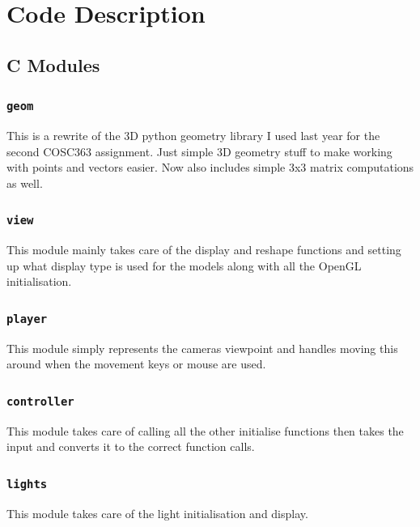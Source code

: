 \section{Code Description}

  \subsection{C Modules}

    \subsubsection{\texttt{geom}}

      This is a rewrite of the 3D python geometry library I used last year for
      the second COSC363 assignment.  Just simple 3D geometry stuff to make
      working with points and vectors easier.  Now also includes simple 3x3
      matrix computations as well.

    \subsubsection{\texttt{view}}

      This module mainly takes care of the display and reshape functions and
      setting up what display type is used for the models along with all the
      OpenGL initialisation.

    \subsubsection{\texttt{player}}

      This module simply represents the cameras viewpoint and handles moving
      this around when the movement keys or mouse are used.

    \subsubsection{\texttt{controller}}

      This module takes care of calling all the other initialise functions then
      takes the input and converts it to the correct function calls.

    \subsubsection{\texttt{lights}}

      This module takes care of the light initialisation and display.

